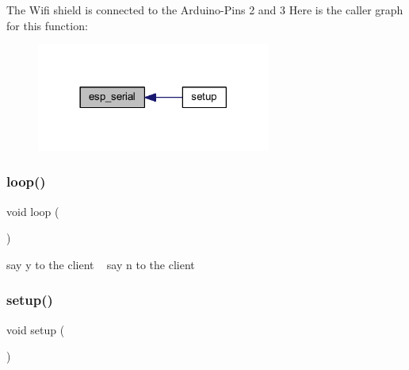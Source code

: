 The Wifi shield is connected to the Arduino-\/\+Pins 2 and 3 Here is the caller graph for this function\+:\nopagebreak
\begin{figure}[H]
\begin{center}
\leavevmode
\includegraphics[width=218pt]{_arduinopart_8ino_af690b3a6882292855c4091ede8039998_icgraph}
\end{center}
\end{figure}
\mbox{\label{_arduinopart_8ino_afe461d27b9c48d5921c00d521181f12f}} 
\subsubsection{\texorpdfstring{loop()}{loop()}}
{\footnotesize\ttfamily void loop (\begin{DoxyParamCaption}{ }\end{DoxyParamCaption})}

say y to the client ~\newline
 say n to the client \mbox{\label{_arduinopart_8ino_a4fc01d736fe50cf5b977f755b675f11d}} 
\subsubsection{\texorpdfstring{setup()}{setup()}}
{\footnotesize\ttfamily void setup (\begin{DoxyParamCaption}{ }\end{DoxyParamCaption})}

